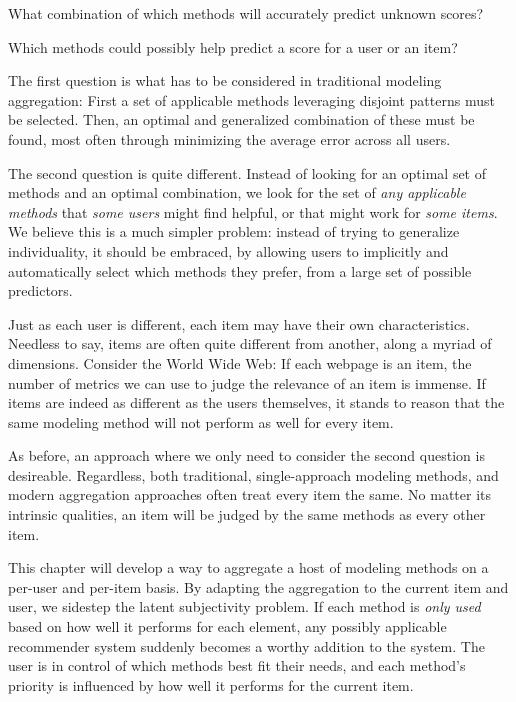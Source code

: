 \begin{enumerate*}
  \item What combination of which methods will accurately predict unknown scores?
  \item Which methods could possibly help predict a score for a user or an item?
\end{enumerate*}

The first question is what has to be considered in traditional modeling aggregation:
First a set of applicable methods leveraging disjoint patterns must be selected. 
Then, an optimal and generalized combination of these must be found,
most often through minimizing the average error across all users.

The second question is quite different. 
Instead of looking for an optimal set of methods and an optimal combination,
we look for the set of \emph{any applicable methods} that \emph{some users} might find helpful,
or that might work for \emph{some items}.
We believe this is a much simpler problem: 
instead of trying to generalize individuality,
it should be embraced, by allowing users to implicitly and automatically select which methods they prefer,
from a large set of possible predictors.

Just as each user is different, each item may have their own characteristics.
Needless to say, items are often quite different from another,
along a myriad of dimensions. Consider the World Wide Web:
If each webpage is an item, the number of metrics we can use to judge
the relevance of an item is immense.
If items are indeed as different as the users themselves, it stands to reason that the same 
modeling method will not perform as well for every item.

As before, an approach where we only need to consider the second question is desireable.
Regardless, both traditional, single-approach modeling methods, and modern aggregation approaches
often treat every item the same. No matter its intrinsic qualities, an item will be judged
by the same methods as every other item. 

This chapter will develop a way to aggregate a host of modeling methods on a per-user and per-item basis.
By adapting the aggregation to the current item and user, we sidestep the latent subjectivity problem. 
If each method is \emph{only used} based on how well it performs for each element,
any possibly applicable recommender system suddenly becomes a worthy addition to the system.
The user is in control of which methods best fit their needs, and
each method's priority is influenced by how well it performs for the current item.
